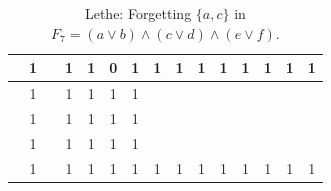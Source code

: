 \begin{table}[!tb]
\begin{tabular}{|c|c|c|c|c|c|c|c|c|c|c|c|c|c|c|}
        \rowcolor{yellow!40}  & 1 &  & 1 & 1 & 0 & 1 & 1 & 1 & 1 & 1 & 1 & 1 & 1 & 1 \\ \hline
        \rowcolor{gray!40}  & 1 &  & 1 & 1 & 1 & 1 &  &  &  &  &  &  &  &  \\ \hline
        \rowcolor{gray!40}  & 1 &  & 1 & 1 & 1 & 1 &  &  &  &  &  &  &  &  \\ \hline
        \rowcolor{gray!40}  & 1 &  & 1 & 1 & 1 & 1 &  &  &  &  &  &  &  &  \\ \hline
        \rowcolor{gray!40}  & 1 &  & 1 & 1 & 1 & 1 & 1 & 1 & 1 & 1 & 1 & 1 & 1 & 1 \\ \hline
    \end{tabular}
    \caption{Lethe: Forgetting $\{a, c\}$ in $F_{7} = (a \lor b) \land (c \lor d) \land (e \lor f)$.}
    \label{tab:lethe-F7-ac}
\end{table}

